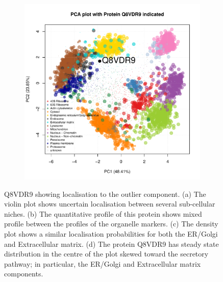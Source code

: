\documentclass[12pt,english]{article}\usepackage[]{graphicx}\usepackage[]{color}
\makeatletter
\def\maxwidth{ %
  \ifdim\Gin@nat@width>\linewidth
    \linewidth
  \else
    \Gin@nat@width
  \fi
}
\newenvironment{knitrout}{}{} %
\makeatother
\begin{document}
\begin{figure}[h]
\begin{subfigure}[t]{0.5\textwidth}
\begin{knitrout}
{}



\end{knitrout}
    \caption{}
  \end{subfigure}%
  \begin{subfigure}[t]{0.5\textwidth}
    \centering
\begin{knitrout}
\color{fgcolor}

{\centering \includegraphics[width=\maxwidth]{figure/Q8VDR9-pca-1} 

}



\end{knitrout}
    \caption{}
  \end{subfigure}

  \caption{Q8VDR9 showing localisation to the outlier component.  (a)
    The violin plot shows uncertain localisation between several
    sub-cellular niches. (b) The quantitative profile of this protein
    shows mixed profile between the profiles of the organelle
    markers. (c) The density plot shows a similar localisation
    probabilities for both the ER/Golgi and Extracellular matrix. (d)
    The protein Q8VDR9 has steady state distribution in the centre of
    the plot skewed toward the secretory pathway; in particular, the
    ER/Golgi and Extracellular matrix components.}
  \label{fig:Q8VDR9}
\end{figure}
\end{document}
